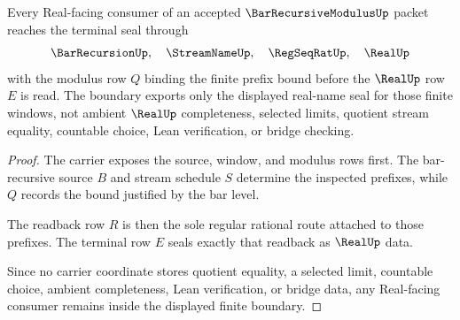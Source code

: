 \begin{theorem}
\label{thm:bar-recursive-modulus-real-seal-boundary}
Every Real-facing consumer of an accepted $\BarRecursiveModulusUp$ packet reaches the terminal seal through
$$
\BarRecursionUp,\quad \StreamNameUp,\quad \RegSeqRatUp,\quad \RealUp
$$
with the modulus row $Q$ binding the finite prefix bound before the $\RealUp$ row $E$ is read. The boundary exports only the displayed real-name seal for those finite windows, not ambient $\RealUp$ completeness, selected limits, quotient stream equality, countable choice, Lean verification, or bridge checking.
\end{theorem}
\begin{proof}
The carrier exposes the source, window, and modulus rows first. The bar-recursive source $B$ and stream schedule $S$ determine the inspected prefixes, while $Q$ records the bound justified by the bar level.

The readback row $R$ is then the sole regular rational route attached to those prefixes. The terminal row $E$ seals exactly that readback as $\RealUp$ data.

Since no carrier coordinate stores quotient equality, a selected limit, countable choice, ambient completeness, Lean verification, or bridge data, any Real-facing consumer remains inside the displayed finite boundary.
\end{proof}




